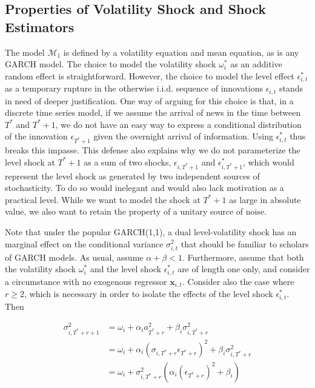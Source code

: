 \documentclass[11pt]{article}
\newcommand{\x}{\textbf{x}}
\def\mc#1{\mathcal{#1}} %
\def\mc#1{\mathcal{#1}}
\theoremstyle{definition}
\begin{document}
\subsection{Properties of Volatility Shock and Shock Estimators}

The model $\mc{M}_1$ is defined by a volatility equation and mean equation, as is any GARCH model.  The choice to model the volatility shock $\omega^{*}_{i}$ as an additive random effect is straightforward.  However, the choice to model the level effect $\epsilon^{*}_{i,t}$ as a temporary rupture in the otherwise i.i.d. sequence of innovations $\epsilon_{i,t}$ stands in need of deeper justification.  One way of arguing for this choice is that, in a discrete time series model, if we assume the arrival of news in the time between $T^{*}$ and $T^{*}+1$, we do not have an easy way to express a conditional distribution of the innovation $\epsilon_{T^{*}+1}$ given the overnight arrival of information.  Using $\epsilon^{*}_{i,t}$ thus breaks this impasse.  This defense also explains why we do not parameterize the level shock at $T^{*}+1$ as a sum of two shocks, $\epsilon_{i,T^{*}+1}$ and $\epsilon^{*}_{i,T^{*}+1}$, which would represent the level shock as generated by two independent sources of stochasticity.  To do so would inelegant and would also lack motivation as a practical level.  While we want to model the shock at $T^{*}+1$ as large in absolute value, we also want to retain the property of a unitary source of noise.

Note that under the popular GARCH(1,1), a dual level-volatility shock has an marginal effect on the conditional variance $\sigma^{2}_{i,t}$ that should be familiar to scholars of GARCH models.  As usual, assume $\alpha+\beta < 1$.  Furthermore, assume that both the volatility shock $\omega^{*}_{i}$ and the level shock $\epsilon^{*}_{i,t}$ are of length one only, and consider a circumstance with no exogenous regressor $\x_{i,t}$. Consider also the case where $r\geq 2$, which is necessary in order to isolate the effects of the level shock $\epsilon^{*}_{i,t}$.  Then

\begin{align}
\sigma^{2}_{i,T^{*}+r+1} & = \omega_{i} + \alpha_{i} a_{T^{*}+r}^{2} + \beta_{i}\sigma^{2}_{i,T^{*}+r} \label{eq0}\\
& = \omega_{i} + \alpha_{i}(\sigma_{i,T^{*}+r}\epsilon_{T^{*}+r})^{2} + \beta_{i}\sigma^{2}_{i,T^{*}+r} \\
& = \omega_{i} + \sigma^{2}_{i,T^{*}+r}(\alpha_{i} (\epsilon_{T^{*}+r})^{2} + \beta_{i})
\end{align}
\end{document}
